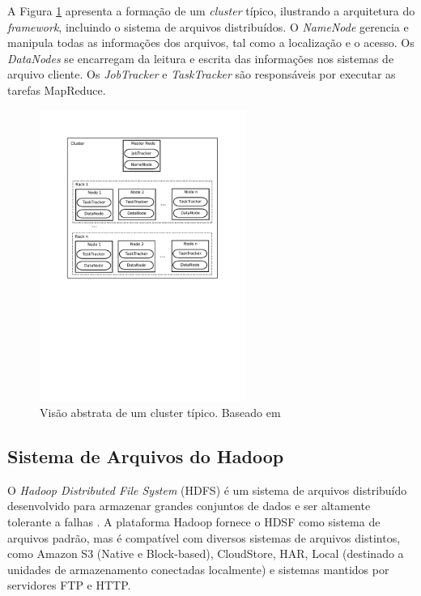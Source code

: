 A Figura \ref{fig:hdfs} apresenta a formação de um \textit{cluster} típico, ilustrando a arquitetura do \textit{framework}, incluindo o sistema de arquivos distribuídos.
O \textit{NameNode} gerencia e manipula todas as informações dos arquivos, tal como a localização e o acesso. Os \textit{DataNodes} se encarregam da leitura e escrita das informações nos sistemas de arquivo cliente. Os \textit{JobTracker} e \textit{TaskTracker} são responsáveis por executar as tarefas MapReduce.
\begin{figure}[htb]
\centering
\includegraphics[trim=2cm 12cm 2cm 2cm, width=0.6\textwidth]{figuras/HadoopCluster.pdf}
\caption{Visão abstrata de um cluster típico. Baseado em \cite{Venner:2009}}
\label{fig:hdfs}
\end{figure}

\subsection{Sistema de Arquivos do Hadoop}

O \textit{ Hadoop Distributed File System} (HDFS) é um sistema de arquivos distribuído desenvolvido para armazenar grandes conjuntos de dados e ser altamente tolerante a falhas \cite{White:2009}.
A plataforma Hadoop fornece o HDSF como sistema de arquivos padrão, mas é compatível com diversos sistemas de arquivos distintos, como Amazon S3 (Native e Block-based), CloudStore, HAR, Local (destinado a unidades de armazenamento conectadas localmente) e sistemas mantidos por servidores FTP e HTTP.

